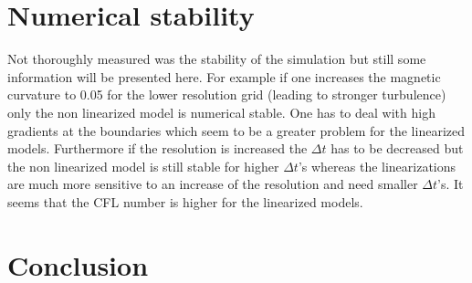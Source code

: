 \documentclass[master.tex]{subfiles}
\begin{document}
\section{Numerical stability}
Not thoroughly measured was the stability of the simulation but still some information will be presented here. For example if one increases the magnetic curvature to 0.05 for the lower resolution grid (leading to stronger turbulence) only the non linearized model is numerical stable. One has to deal with high gradients at the boundaries which seem to be a greater problem for the linearized models. 
Furthermore if the resolution is increased the $\Delta t$ has to be decreased but the non linearized model is still stable for higher $\Delta t$'s whereas the linearizations are much more sensitive to an increase of the resolution and need smaller $\Delta t$'s. It seems that the \ac{CFL} number is higher for the linearized models.

\section{Conclusion}
\end{document}
